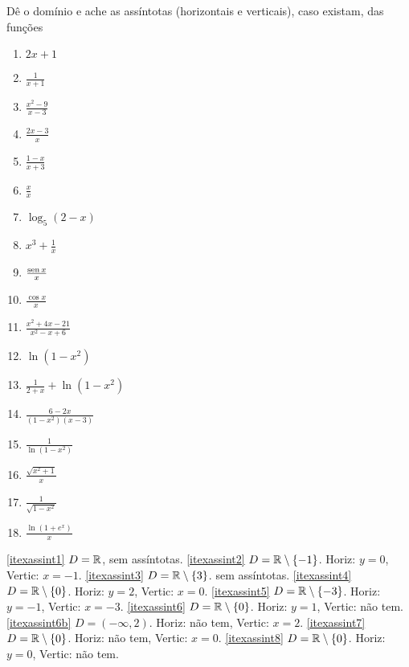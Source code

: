\begin{exo}
Dê o domínio e ache as assíntotas (horizontais e verticais), caso
existam, das funções 
\begin{multicols}{4}
\begin{enumerate}
\item\label{itexassint1} $2x+1$
\item\label{itexassint2} $\frac{1}{x+1}$
\item\label{itexassint3} $\frac{x^2-9}{x-3}$
\item\label{itexassint4} $\frac{2x-3}{x}$
\item\label{itexassint5} $\frac{1-x}{x+3}$
\item\label{itexassint6} $\frac{x}{x}$
\item\label{itexassint6b} $\log_5(2-x)$
\item\label{itexassint7} $x^3+\frac{1}{x}$
\item\label{itexassint8} $\frac{\operatorname{sen} x}{x}$
\item\label{itexassint9} $\frac{\cos x}{x}$
\item\label{itexassint10} $\frac{x^2+4x-21}{x^2-x+6}$
\item\label{itexassint11} $\ln(1-x^2)$
\item\label{itexassint12} $\frac{1}{2+x}+\ln(1-x^2)$
\item\label{itexassint13} $\frac{6-2x}{(1-x^2)(x-3)}$
\item\label{itexassint14} $\frac{1}{\ln(1-x^2)}$
\item\label{itexassint17} $\frac{\sqrt{x^2+1}}{x}$
\item\label{itexassint15b} $\frac{1}{\sqrt{1-x^2}}$
\item\label{itexassint18} $\frac{\ln(1+e^x)}{x}$
\end{enumerate}
\end{multicols}
\vspace{0.01cm}
\begin{sol}
\eqref{itexassint1} $D=\mathbb{R}$, sem assíntotas.
\eqref{itexassint2} $D=\mathbb{R}\setminus\{-1\}$. Horiz: $y=0$, Vertic: $x=-1$.
\eqref{itexassint3} $D=\mathbb{R}\setminus\{3\}$. sem assíntotas.
\eqref{itexassint4} $D=\mathbb{R}\setminus\{0\}$. Horiz: $y=2$, Vertic: $x=0$.
\eqref{itexassint5} $D=\mathbb{R}\setminus\{-3\}$. Horiz: $y=-1$, Vertic: $x=-3$.
\eqref{itexassint6} $D=\mathbb{R}\setminus\{0\}$. Horiz: $y=1$, Vertic: não tem.
\eqref{itexassint6b} $D=(-\infty,2)$. Horiz: não tem, Vertic: $x=2$.
\eqref{itexassint7} $D=\mathbb{R}\setminus\{0\}$. Horiz: não tem, Vertic: $x=0$.
\eqref{itexassint8} $D=\mathbb{R}\setminus\{0\}$. Horiz: $y=0$, Vertic: não tem.

\end{sol}
\end{exo}
